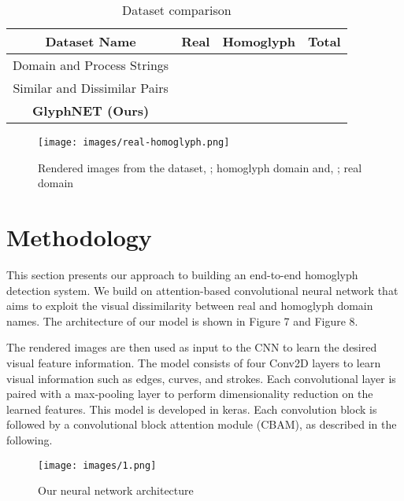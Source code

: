 \documentclass[letterpaper]{article} \usepackage{aaai22}  \usepackage{times}  \usepackage{helvet}  \usepackage{courier}  \usepackage[hyphens]{url}  \usepackage{graphicx} \urlstyle{rm} \def\UrlFont{\rm}  \usepackage{natbib}  \usepackage{caption} \DeclareCaptionStyle{ruled}{labelfont=normalfont,labelsep=colon,strut=off} \frenchspacing  \setlength{\pdfpagewidth}{8.5in}  \setlength{\pdfpageheight}{11in}  \usepackage{algorithm}
\begin{document}
\begin{table*}[!ht]
    \centering
    \begin{tabular}{|c|c|c|c|} \hline
         \textbf{Dataset Name} & \textbf{Real} & \textbf{Homoglyph} & \textbf{Total} \\ \hline
         Domain and Process Strings\cite{woodbridge2018detecting}&  &  &  \\ \hline
         Similar and Dissimilar Pairs\cite{majumder2020convolutional} &  &  &  \\ \hline
         \textbf{GlyphNET (Ours)} & \textbf{} & \textbf{} & \textbf{}\\ \hline
    \end{tabular}
    \caption{Dataset comparison}
    \label{tab:my_label}
\end{table*}

\begin{figure}
    \texttt{[image: images/real-homoglyph.png]}
    \caption{Rendered images from the dataset, ; homoglyph domain and, ; real domain}
    \label{fig5}
\end{figure}



\section{Methodology}

This section presents our approach to building an end-to-end homoglyph detection system. We build on attention-based\cite{bahdanau2014neural}\cite{vaswani2017attention} convolutional neural network\cite{lecun1995convolutional} that aims to exploit the visual dissimilarity between real and homoglyph domain names. The architecture of our model is shown in Figure 7 and Figure 8.

The rendered images are then used as input to the CNN to learn the desired visual feature information. The model consists of four Conv2D layers to learn visual information such as edges, curves, and strokes. Each convolutional layer is paired with a max-pooling layer to perform dimensionality reduction on the learned features. This model is developed in keras\cite{chollet2015keras}. Each convolution block is followed by a convolutional block attention module (CBAM), as described in the following.


\begin{figure*}[!ht]
  \texttt{[image: images/1.png]}
  \caption{Our neural network architecture}
\end{figure*}
\end{document}
